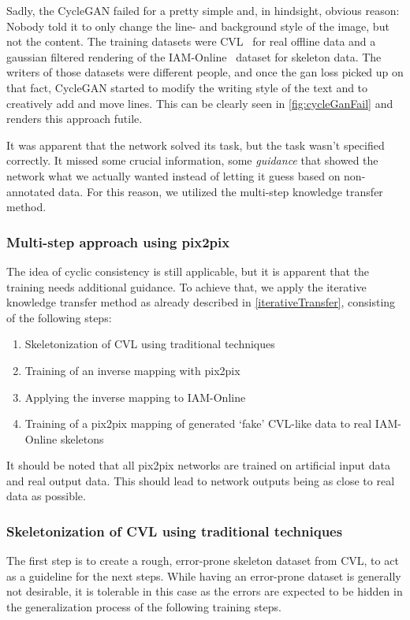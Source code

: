 Sadly, the \gls{CycleGAN} failed for a pretty simple and, in hindsight, obvious reason: Nobody told it to only change the line- and background style of the image, but not the content. The training datasets were CVL~\cite{cvl} for real offline data and a gaussian filtered rendering of the IAM-Online~\cite{iam-online} dataset for skeleton data. The writers of those datasets were different people, and once the \gls{gan} loss picked up on that fact, \gls{CycleGAN} started to modify the writing style of the text and to creatively add and move lines. This can be clearly seen in \cref{fig:cycleGanFail} and renders this approach futile.

It was apparent that the network solved its task, but the task wasn't specified correctly. It missed some crucial information, some \emph{guidance} that showed the network what we actually wanted instead of letting it guess based on non-annotated data. For this reason, we utilized the multi-step knowledge transfer method.

\subsubsection{Multi-step approach using pix2pix}

The idea of cyclic consistency is still applicable, but it is apparent that the training needs additional guidance. \newpage To achieve that, we apply the iterative knowledge transfer method as already described in \cref{iterativeTransfer}, consisting of the following steps:

\begin{enumerate}
\item Skeletonization of CVL using traditional techniques
\item Training of an inverse mapping with \gls{pix2pix}
\item Applying the inverse mapping to IAM-Online
\item Training of a \gls{pix2pix} mapping of generated `fake' CVL-like data to real IAM-Online skeletons
\end{enumerate}

It should be noted that all \gls{pix2pix} networks are trained on artificial input data and real output data. This should lead to network outputs being as close to real data as possible.

\subsubsection{Skeletonization of CVL using traditional techniques}
The first step is to create a rough, error-prone skeleton dataset from CVL, to act as a guideline for the next steps. While having an error-prone dataset is generally not desirable, it is tolerable in this case as the errors are expected to be hidden in the generalization process of the following training steps.

